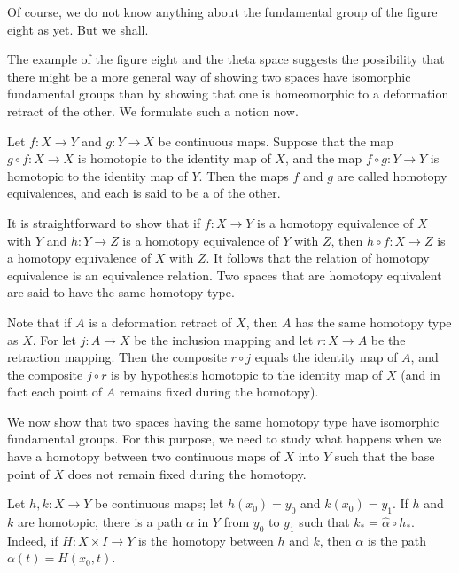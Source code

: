 Of course, we do not know anything about the fundamental group of the figure eight as yet. But we shall.

The example of the figure eight and the theta space suggests the possibility that there might be a more general way of showing two spaces have isomorphic fundamental groups than by showing that one is homeomorphic to a deformation retract of the other. We formulate such a notion now.

\begin{definition}
Let \(f : X \rightarrow Y\) and \(g : Y \rightarrow X\) be continuous maps. Suppose that the map \(g \circ f : X \rightarrow X\) is homotopic to the identity map of \(X\), and the map \(f \circ g : Y \rightarrow Y\) is homotopic to the identity map of \(Y\). Then the maps \(f\) and \(g\) are called homotopy equivalences, and each is said to be a  of the other.
\end{definition}

It is straightforward to show that if \(f : X \rightarrow Y\) is a homotopy equivalence of \(X\) with \(Y\) and \(h : Y \rightarrow Z\) is a homotopy equivalence of \(Y\) with \(Z\), then \(h \circ f : X \rightarrow Z\) is a homotopy equivalence of \(X\) with \(Z\). It follows that the relation of homotopy equivalence is an equivalence relation. Two spaces that are homotopy equivalent are said to have the same homotopy type.

Note that if \(A\) is a deformation retract of \(X\), then \(A\) has the same homotopy type as \(X\). For let \(j : A \rightarrow X\) be the inclusion mapping and let \(r : X \rightarrow A\) be the retraction mapping. Then the composite \(r \circ j\) equals the identity map of \(A\), and the composite \(j \circ r\) is by hypothesis homotopic to the identity map of \(X\) (and in fact each point of \(A\) remains fixed during the homotopy).

We now show that two spaces having the same homotopy type have isomorphic fundamental groups. For this purpose, we need to study what happens when we have a homotopy between two continuous maps of \(X\) into \(Y\) such that the base point of \(X\) does not remain fixed during the homotopy.

\begin{lemma}
\label{lem:\thetheorem}
Let \(h,k : X \rightarrow Y\) be continuous maps; let \(h( x_{0}) = y_{0}\) and \(k( x_{0}) = y_{1}\). If \(h\) and \(k\) are homotopic, there is a path \(\alpha\) in \(Y\) from \(y_{0}\) to \(y_{1}\) such that \(k_{ * } = \hat{\alpha } \circ {h}_{ * }\). Indeed, if \(H : X \times I \rightarrow Y\) is the homotopy between \(h\) and \(k\), then \(\alpha\) is the path \(\alpha ( t) = H( {x_{0},t})\).
\end{lemma}


